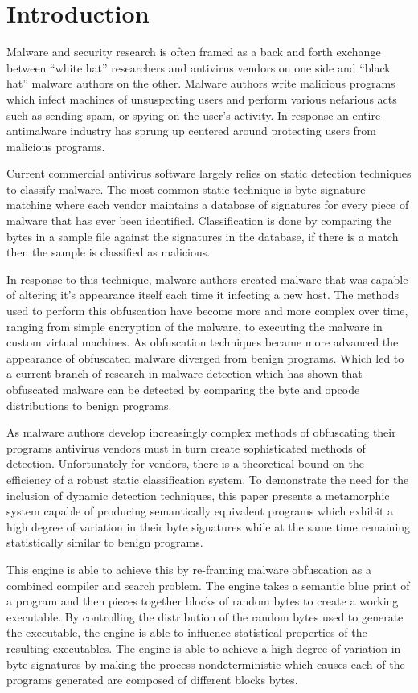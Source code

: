 \chapter{Introduction}

    Malware and security research is often framed as a back and forth exchange
    between ``white hat'' researchers and antivirus vendors on one side and
    ``black hat'' malware authors on the other. Malware authors write malicious
    programs which infect machines of unsuspecting users and perform various
    nefarious acts such as sending spam, or spying on the user's activity. In
    response an entire antimalware industry has sprung up centered around
    protecting users from malicious programs.

    Current commercial antivirus software largely relies on static detection
    techniques to classify malware. The most common static technique is
    byte signature matching where each vendor maintains a database of signatures
    for every piece of malware that has ever been identified. Classification is
    done by comparing the bytes in a sample file against the signatures in the
    database, if there is a match then the sample is classified as malicious.

    In response to this technique, malware authors created malware that was
    capable of altering it's appearance itself each time it infecting a new
    host. The methods used to perform this obfuscation have become more and more
    complex over time, ranging from simple encryption of the malware, to
    executing the malware in custom virtual machines. As obfuscation techniques
    became more advanced the appearance of obfuscated malware diverged from
    benign programs. Which led to a current branch of research in malware
    detection which has shown that obfuscated malware can be detected by
    comparing the byte and opcode distributions to benign programs.

    As malware authors develop increasingly complex methods of obfuscating their
    programs antivirus vendors must in turn create sophisticated methods of
    detection. Unfortunately for vendors, there is a theoretical bound on the
    efficiency of a robust static classification system\cite{npcomplete}. To
    demonstrate the need for the inclusion of dynamic detection techniques, this
    paper presents a metamorphic system capable of producing semantically
    equivalent programs which exhibit a high degree of variation in their
    byte signatures while at the same time remaining statistically similar to
    benign programs.

    This engine is able to achieve this by re-framing malware obfuscation as a
    combined compiler and search problem. The engine takes a semantic blue print
    of a program and then pieces together blocks of random bytes to create a
    working executable. By controlling the distribution of the random bytes used
    to generate the executable, the engine is able to influence statistical
    properties of the resulting executables. The engine is able to achieve a
    high degree of variation in byte signatures by making the process
    nondeterministic which causes each of the programs generated are composed of
    different blocks bytes.

